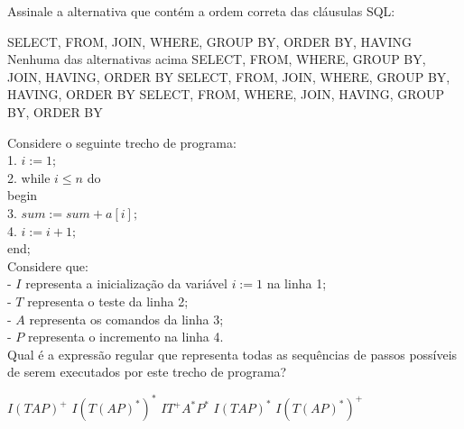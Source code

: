 \documentclass[12pt, addpoints]{exam}
\begin{document}
    \begin{questions}

    \newpage
    \question

Assinale a alternativa que contém a ordem correta das cláusulas SQL:


\begin{choices}
\choice SELECT, FROM, JOIN, WHERE, GROUP BY, ORDER BY, HAVING
\choice Nenhuma das alternativas acima
\choice SELECT, FROM, WHERE, GROUP BY, JOIN, HAVING, ORDER BY
\choice SELECT, FROM, JOIN, WHERE, GROUP BY, HAVING, ORDER BY
\choice SELECT, FROM, WHERE, JOIN, HAVING, GROUP BY, ORDER BY
\end{choices}

\question

Considere o seguinte trecho de programa:\\

1. \( i := 1; \)\\

2. while \( i \leq n \) do\\

   begin\\

3. \( sum := sum + a[i]; \)\\

4. \( i := i + 1; \)\\

   end;\\



Considere que:\\

- \( I \) representa a inicialização da variável \( i := 1 \) na linha 1;\\

- \( T \) representa o teste da linha 2;\\

- \( A \) representa os comandos da linha 3;\\

- \( P \) representa o incremento na linha 4.\\



Qual é a expressão regular que representa todas as sequências de passos possíveis de serem executados por este trecho de programa?
\begin{choices}
\choice \( I(TAP)^+ \)
\choice \( I(T(AP)^*)^* \)
\choice \( IT^+A^*P^* \)
\choice \( I(TAP)^* \)
\choice \( I(T(AP)^*)^+ \)
\end{choices}


\end{questions}
\end{document}

